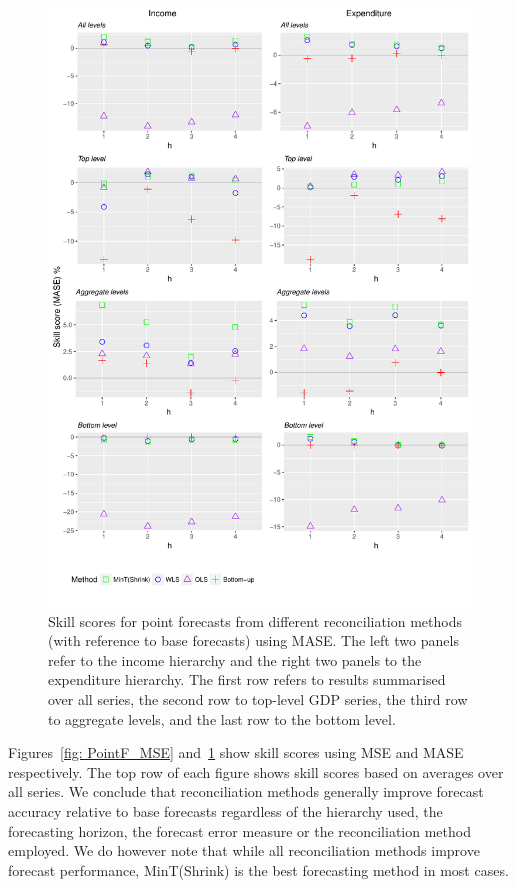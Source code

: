 \documentclass[a4paper, 11pt]{article}
\begin{document}
\begin{figure}
	\centering
	\small
	\includegraphics[width=\textwidth]{Figs/Results/PointF_MASE.pdf}
	\caption{Skill scores for point forecasts from different reconciliation methods (with reference to base forecasts) using MASE\@. The left two panels refer to the income hierarchy and the right two panels to the expenditure hierarchy. The first row refers to results summarised over all series, the second row to top-level GDP series, the third row to aggregate levels, and the last row to the bottom level.}
	\label{fig: PointF_MASE}
\end{figure}

Figures~\ref{fig: PointF_MSE} and~\ref{fig: PointF_MASE} show skill scores using MSE and MASE respectively. The top row of each figure shows skill scores based on averages over all series. We conclude that reconciliation methods generally improve forecast accuracy relative to base forecasts regardless of the hierarchy used, the forecasting horizon, the forecast error measure or the reconciliation method employed. We do however note that while all reconciliation methods improve forecast performance, MinT(Shrink) is the best forecasting method in most cases.
\end{document}
